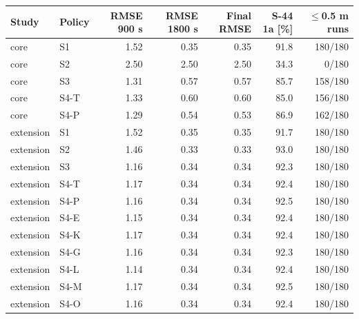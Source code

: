 \begin{tabular}{llrrrrr}\toprule
Study & Policy & RMSE 900 s & RMSE 1800 s & Final RMSE & S-44 1a [\%] & $\le$0.5 m runs\\\midrule
core & S1 & 1.52 & 0.35 & 0.35 & 91.8 & 180/180\\
core & S2 & 2.50 & 2.50 & 2.50 & 34.3 & 0/180\\
core & S3 & 1.31 & 0.57 & 0.57 & 85.7 & 158/180\\
core & S4-T & 1.33 & 0.60 & 0.60 & 85.0 & 156/180\\
core & S4-P & 1.29 & 0.54 & 0.53 & 86.9 & 162/180\\
extension & S1 & 1.52 & 0.35 & 0.35 & 91.7 & 180/180\\
extension & S2 & 1.46 & 0.33 & 0.33 & 93.0 & 180/180\\
extension & S3 & 1.16 & 0.34 & 0.34 & 92.3 & 180/180\\
extension & S4-T & 1.17 & 0.34 & 0.34 & 92.4 & 180/180\\
extension & S4-P & 1.16 & 0.34 & 0.34 & 92.5 & 180/180\\
extension & S4-E & 1.15 & 0.34 & 0.34 & 92.4 & 180/180\\
extension & S4-K & 1.17 & 0.34 & 0.34 & 92.4 & 180/180\\
extension & S4-G & 1.16 & 0.34 & 0.34 & 92.3 & 180/180\\
extension & S4-L & 1.14 & 0.34 & 0.34 & 92.4 & 180/180\\
extension & S4-M & 1.17 & 0.34 & 0.34 & 92.5 & 180/180\\
extension & S4-O & 1.16 & 0.34 & 0.34 & 92.4 & 180/180\\
\bottomrule\end{tabular}
